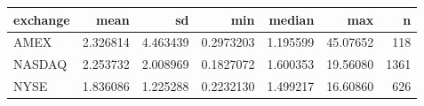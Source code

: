 
\begin{tabular}{lrrrrrr}
\toprule
exchange & mean & sd & min & median & max & n\\
\midrule
AMEX & 2.326814 & 4.463439 & 0.2973203 & 1.195599 & 45.07652 & 118\\
NASDAQ & 2.253732 & 2.008969 & 0.1827072 & 1.600353 & 19.56080 & 1361\\
NYSE & 1.836086 & 1.225288 & 0.2232130 & 1.499217 & 16.60860 & 626\\
\bottomrule
\end{tabular}
